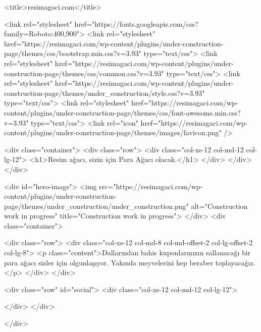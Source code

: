 

  
    
    
    
    <title>resimagaci.com</title>
    
    
    <link rel="stylesheet" href="https://fonts.googleapis.com/css?family=Roboto:400,900">
    <link rel="stylesheet" href="https://resimagaci.com/wp-content/plugins/under-construction-page/themes/css/bootstrap.min.css?v=3.93" type="text/css">
<link rel="stylesheet" href="https://resimagaci.com/wp-content/plugins/under-construction-page/themes/css/common.css?v=3.93" type="text/css">
<link rel="stylesheet" href="https://resimagaci.com/wp-content/plugins/under-construction-page/themes/under_construction/style.css?v=3.93" type="text/css">
<link rel="stylesheet" href="https://resimagaci.com/wp-content/plugins/under-construction-page/themes/css/font-awesome.min.css?v=3.93" type="text/css">
<link rel="icon" href="https://resimagaci.com/wp-content/plugins/under-construction-page/themes/images/favicon.png" />
  

  
    <div class="container">
      <div class="row">
        <div class="col-xs-12 col-md-12 col-lg-12">
          <h1>Resim ağacı, sizin için Para Ağacı olacak.</h1>
        </div>
      </div>
    </div>

    <div id="hero-image">
      <img src="https://resimagaci.com/wp-content/plugins/under-construction-page/themes/under_construction/under_construction.png" alt="Construction work in progress" title="Construction work in progress">
    </div>
    <div class="container">

      <div class="row">
        <div class="col-xs-12 col-md-8 col-md-offset-2 col-lg-offset-2 col-lg-8">
          <p class="content">Dallarından bahis kuponlarınızın sallanacağı bir para ağacı sizler için olgunlaşıyor. Yakında meyvelerini hep beraber toplayacağız.</p>
        </div>
      </div>

      <div class="row" id="social">
        <div class="col-xs-12 col-md-12 col-lg-12">
          
        </div>
      </div>

    </div>
    
  

